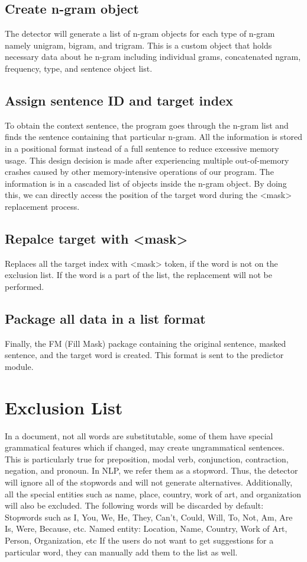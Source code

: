 \documentclass[12pt,oneside,openright,a4paper]{cpe-english-project}
\begin{document}
\subsection{Create n-gram object}
The detector will generate a list of n-gram objects for each type of n-gram namely unigram, bigram, and trigram. This is a custom object that holds necessary data about he n-gram including individual grams, concatenated ngram, frequency, type, and sentence object list.
\subsection{Assign sentence ID and target index}
  To obtain the context sentence, the program goes through the n-gram list and finds the sentence containing that particular n-gram. All the information is stored in a positional format instead of a full sentence to reduce excessive memory usage. This design decision is made after experiencing multiple out-of-memory crashes caused by other memory-intensive operations of our program. The information is in a cascaded list of objects inside the n-gram object. By doing this, we can directly access the position of the target word during the <mask> replacement process.
\subsection{Repalce target with <mask>}

 Replaces all the target index with <mask> token, if the word is not on the exclusion list. If the word is a part of the list, the replacement will not be performed. 



\subsection{Package all data in a list format}
Finally, the FM (Fill Mask) package containing the original sentence, masked sentence, and the target word is created. This format is sent to the predictor module.

\section{Exclusion List}
In a document, not all words are substitutable, some of them have special grammatical features which if changed, may create ungrammatical sentences. This is particularly true for preposition, modal verb, conjunction, contraction, negation, and pronoun. In NLP, we refer them as a stopword. Thus, the detector will ignore all of the stopwords and will not generate alternatives. Additionally, all the special entities such as name, place, country, work of art, and organization will also be excluded. The following words will be discarded by default: Stopwords such as I, You, We, He, They, Can’t, Could, Will, To, Not, Am, Are Is, Were, Because, etc. Named entity: Location, Name, Country, Work of Art, Person, Organization, etc
If the users do not want to get suggestions for a particular word, they can manually add them to the list as well.
\end{document}
